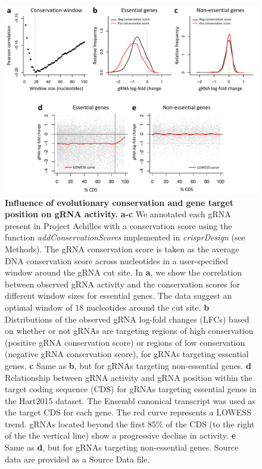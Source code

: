 \documentclass[pdftex,english,10pt]{article}
\begin{document}
\begin{figure}[!h]
\centering
\includegraphics[width=1\textwidth]{../figures/cons/cons.pdf}
  \caption{\textbf{Influence of evolutionary conservation and gene target position on gRNA activity.} 
\textbf{a-c} We annotated each gRNA present in Project Achilles with a conservation score using the function \textit{addConservationScores} implemented in \textit{crisprDesign} (see Methods). The gRNA conservation score is taken as the average DNA conservation score across nucleotides in a user-specified window around the gRNA cut site. In \textbf{a}, we show the correlation between observed gRNA activity and the conservation scores for different window sizes for essential genes. The data suggest an optimal window of 18 nucleotides around the cut site. \textbf{b} Distributions of the observed gRNA log-fold changes (LFCs) based on whether or not gRNAs are targeting regions of high conservation (positive gRNA conservation score) or regions of low conservation (negative gRNA conservation score), for gRNAs targeting essential genes. \textbf{c} Same as \textbf{b}, but for gRNAs targeting non-essential genes. \textbf{d} Relationship between gRNA activity and gRNA position within the target coding sequence (CDS) for gRNAs targeting essential genes in the Hart2015 dataset.  The Ensembl canonical transcript was used as the target CDS for each gene. The red curve represents a LOWESS trend. gRNAs located beyond the first 85\% of the CDS (to the right of the the vertical line) show a progressive decline in activity. \textbf{e} Same as \textbf{d}, but for gRNAs targeting non-essential genes.  Source data are provided as a Source Data file.
  }
  \label{suppfig:cons}
\end{figure}
\end{document}
